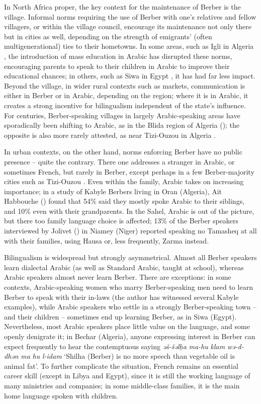 \documentclass[output=paper]{langsci/langscibook}
\begin{document}
In North Africa proper, the key context for the maintenance of Berber is the village. Informal norms requiring the use of Berber with one's relatives and fellow villagers, or within the village council, encourage its maintenance not only there but in cities as well, depending on the strength of emigrants' (often multigenerational) ties to their hometowns. In some areas, such as Igli in Algeria \citep{Mouili2013}, the introduction of mass education in Arabic has disrupted these norms, encouraging parents to speak to their children in Arabic to improve their educational chances; in others, such as Siwa in Egypt \citep{Serreli2017}, it has had far less impact. Beyond the village, in wider rural contexts such as markets, communication is either in Berber or in Arabic, depending on the region; where it is in Arabic, it creates a strong incentive for bilingualism independent of the state's influence.  For centuries, Berber-speaking villages in largely Arabic-speaking areas have sporadically been shifting to Arabic, as in the Blida region of Algeria (\citealt{ElArifi2014}); the opposite is also more rarely attested, as near Tizi-Ouzou in Algeria \citep[258]{Gautier1913}.

In urban contexts, on the other hand, norms enforcing Berber have no public presence – quite the contrary.  There one addresses a stranger in Arabic, or sometimes French, but rarely in Berber, except perhaps in a few Berber-majority cities such as Tizi{}-Ouzou \citep{Tigziri2008}.  Even within the family, Arabic takes on increasing importance; in a study of Kabyle Berbers living in Oran (Algeria), Ait Habbouche (\citeyear[79]{AitHabbouche2013}) found that 54\% said they mostly spoke Arabic to their siblings, and 10\% even with their grandparents. In the Sahel, Arabic is out of the picture, but there too family language choice is affected; 13\% of the Berber speakers interviewed by Jolivet (\citeyear[146]{Jolivet2008}) in Niamey (Niger) reported speaking no Tamasheq at all with their families, using Hausa or, less frequently, Zarma instead.

Bilingualism is widespread but strongly asymmetrical. Almost all Berber speakers learn dialectal Arabic (as well as Standard Arabic, taught at school), whereas Arabic speakers almost never learn Berber.  There are exceptions: in some contexts, Arabic-speaking women who marry Berber-speaking men need to learn Berber to speak with their in-laws (the author has witnessed several Kabyle examples), while Arabic speakers who settle in a strongly Berber-speaking town – and their children – sometimes end up learning Berber, as in Siwa (Egypt). Nevertheless, most Arabic speakers place little value on the language, and some openly denigrate it; in Bechar (Algeria), anyone expressing interest in Berber can expect frequently to hear the contemptuous saying \textit{əš-šəlḥa} \textit{ma-hu} \textit{klam} \textit{wə-d-dhən} \textit{ma} \textit{hu} \textit{l-idam} `Shilha (Berber) is no more speech than vegetable oil is animal fat'. To further complicate the situation, French remains an essential career skill (except in Libya and Egypt), since it is still the working language of many ministries and companies; in some middle-class families, it is the main home language spoken with children.
\end{document}

